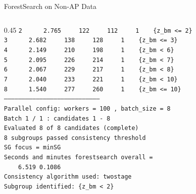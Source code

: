 \documentclass[
  ignorenonframetext,
  aspectratio=169]{beamer}
\begin{document}
\begin{frame}{ForestSearch on Non-AP Data}
\begin{columns}[T]
\begin{column}{0.45\textwidth}
{\texttt{2~~~~~~2.765~~~~~122~~~~~112~~~~~1~~~~\{z\_bm~<=~2\}}\\[-2pt]
\texttt{3~~~~~~2.682~~~~~138~~~~~128~~~~~1~~~~\{z\_bm~<=~3\}}\\[-2pt]
\texttt{4~~~~~~2.149~~~~~210~~~~~198~~~~~1~~~~\{z\_bm~<~6\}}\\[-2pt]
\texttt{5~~~~~~2.095~~~~~226~~~~~214~~~~~1~~~~\{z\_bm~<~7\}}\\[-2pt]
\texttt{6~~~~~~2.067~~~~~229~~~~~217~~~~~1~~~~\{z\_bm~<~8\}}\\[-2pt]
\texttt{7~~~~~~2.040~~~~~233~~~~~221~~~~~1~~~~\{z\_bm~<~10\}}\\[-2pt]
\texttt{8~~~~~~1.540~~~~~277~~~~~260~~~~~1~~~~\{z\_bm~<=~10\}}\\[-2pt]
\texttt{--------------------------------------------------------------------------------}\\[-2pt]
\vspace{2pt}
\texttt{Parallel~config:~workers~=~100~,~batch\_size~=~8}\\[-2pt]
\texttt{Batch~1~/~1~:~candidates~1~-~8}\\[-2pt]
\texttt{Evaluated~8~of~8~candidates~(complete)}\\[-2pt]
\texttt{8~subgroups~passed~consistency~threshold}\\[-2pt]
\texttt{SG~focus~=~minSG}\\[-2pt]
\texttt{Seconds~and~minutes~forestsearch~overall~=~}\\[-2pt]
\texttt{~~~~6.519~0.1086}\\[-2pt]
\texttt{Consistency~algorithm~used:~twostage}\\[-2pt]
\texttt{Subgroup~identified:~\{z\_bm~<~2\}}\\[-2pt]
}
\end{column}
\end{columns}

\normalsize
\end{frame}
\end{document}
